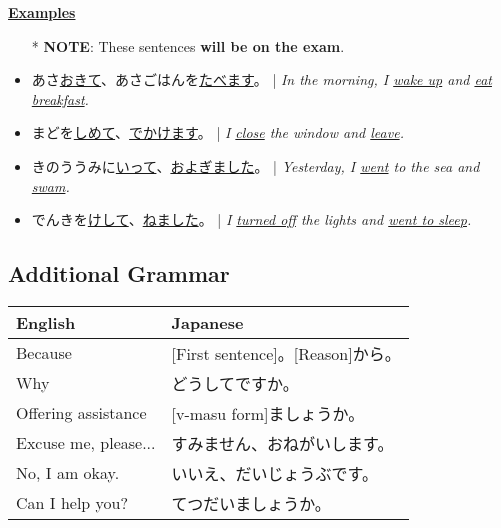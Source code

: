 \documentclass{article}
\begin{document}
\begin{CJK}{UTF8}{min}
\bigskip

\uline{\bf Examples}
\begin{itemize}
\item[*] {\bf NOTE}: These sentences {\bf will be on the exam}.
\item あさ\uline{おきて}、あさごはんを\uline{たべます}。 | \emph{In the morning, I \uline{wake up} and \uline{eat breakfast}.}
\item まどを\uline{しめて}、\uline{でかけます}。 | \emph{I \uline{close} the window and \uline{leave}.}
\item きのううみに\uline{いって}、\uline{およぎました}。 | \emph{Yesterday, I \uline{went} to the sea and \uline{swam}.}
\item でんきを\uline{けして}、\uline{ねました}。 | \emph{I \uline{turned off} the lights and \uline{went to sleep}.}
\end{itemize}

\subsection{Additional Grammar}

\begin{tabular}{ | l | l | }
\hline
English & Japanese\\
\hline
Because & [First sentence]。[Reason]から。\\
Why & どうしてですか。\\
Offering assistance & [v-masu form]ましょうか。\\
Excuse me, please... & すみません、おねがいします。\\
No, I am okay. & いいえ、だいじょうぶです。\\
Can I help you? & てつだいましょうか。\\
\hline
\end{tabular}











\end{CJK}
\end{document}
